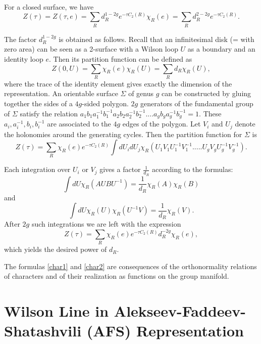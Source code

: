 \documentclass[11pt]{report}
\theoremstyle{plain}
\theoremstyle{definition}
\theoremstyle{remark}
\theoremstyle{remark}
\numberwithin{equation}{section}
\begin{document}
For a closed surface, we have
%
\begin{equation}\label{Z_C}
Z(\tau) = Z(\tau, e) = \sum_R d_R^{1-2g} e^{- \tau C_2(R)} \chi_R(e) = \sum_R d_R^{2-2g} e^{- \tau C_2(R)}.
\end{equation}

The factor $d_R^{1-2g}$ is obtained as follows. Recall that an infinitesimal disk (= with zero area) can be seen as a 2-surface with a Wilson loop $U$ as a boundary and an identity loop $e$. Then its partition function can be defined as  
$$
Z(0, U) = \sum_R \chi_R(e) \chi_R(U) = \sum_R d_R \chi_R(U),
$$
where the trace of the identity element gives exactly the dimension of the representation. 
An orientable surface $\Sigma$ of genus $g$ can be constructed by gluing together the sides of a $4g$-sided polygon. $2g$ generators of the fundamental group of $\Sigma$ satisfy the relation $a_1b_1 a_1^{-1} b_1^{-1}a_2b_2 a_2^{-1} b_2^{-1}....a_gb_g a_g^{-1} b_g^{-1} = 1$. These $a_i, a_i^{-1}, b_i, b_i^{-1}$ are associated to the $4g$ edges of the polygon. Let $V_i$ and $U_j$ denote the holonomies around the generating cycles. Then the partition function for $\Sigma$ is
\begin{equation}
Z(\tau) = \sum_R \chi_R(e) e^{- \tau C_2(R)} \int dU_i dU_j \chi_R(U_1V_1U_1^{-1}V_1^{-1}.....U_gV_gU_g^{-1}V_g^{-1}).
\end{equation}

Each integration over $U_i$ or $V_j$ gives a factor $\frac{1}{d_R}$ according to the formulas:
\begin{equation}\label{char1}
\int dU \chi_R (AUBU^{-1}) = \frac{1}{d_R} \chi_R(A) \chi_R(B)
\end{equation}
and
\begin{equation}\label{char2}
\int dU \chi_R (U)\chi_R (U^{-1}V) = \frac{1}{d_R} \chi_R(V).
\end{equation}
After $2g$ such integrations we are left with the expression
$$
Z(\tau) = \sum_R \chi_R(e) e^{- \tau C_2(R)}d_R^{-2g} \chi_R(e),
$$
which yields the desired power of $d_R$.

The formulas \eqref{char1} and \eqref{char2} are consequences of the orthonormality relations of characters and of their realization as functions on the group manifold.



\section{Wilson Line in Alekseev-Faddeev-Shatashvili (AFS) Representation}
\end{document}
